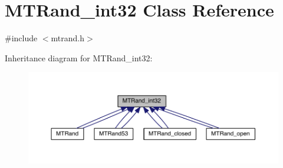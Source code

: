 \hypertarget{a00018}{\section{M\+T\+Rand\+\_\+int32 Class Reference}
\label{a00018}
}


{\ttfamily \#include $<$mtrand.\+h$>$}



Inheritance diagram for M\+T\+Rand\+\_\+int32\+:\nopagebreak
\begin{figure}[H]
\begin{center}
\leavevmode
\includegraphics[width=350pt]{a00224}
\end{center}
\end{figure}
